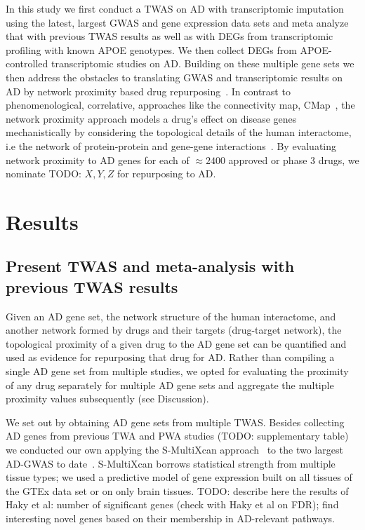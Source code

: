 \documentclass[letterpaper]{article}
\begin{document}
In this study we first conduct a TWAS on AD with transcriptomic
imputation~\citep{Barbeira2018} using the latest, largest GWAS and
gene expression data sets and meta analyze that with previous TWAS results as
well as with DEGs from transcriptomic profiling with known APOE genotypes.  We
then collect DEGs from APOE-controlled transcriptomic studies on AD.  Building
on these multiple gene sets we then address the obstacles to translating GWAS
and transcriptomic results on AD by network proximity based drug
repurposing~\citep{Cheng2018}.  In contrast to phenomenological, correlative,
approaches like the connectivity map, CMap~\citep{Lamb2006}, the network
proximity approach models a drug's effect on disease genes mechanistically by
considering the topological details of the human interactome, i.e the network
of protein-protein and gene-gene interactions~\citep{Guney2016,Barabasi2011}.
By evaluating network proximity to AD genes for each of $\approx 2400$
approved or phase 3 drugs, we nominate TODO: $X, Y, Z$ for repurposing to AD.

\section{Results}

\subsection{Present TWAS and meta-analysis with previous TWAS results}

Given an AD gene set, the network structure of the human interactome, and
another network formed by drugs and their targets (drug-target network), the
topological proximity of a given drug to the AD gene set can be
quantified\citep{Guney2016} and used as evidence for repurposing that drug for
AD.  Rather than compiling a single AD gene set from multiple studies, we
opted for evaluating the proximity of any drug separately for multiple AD gene
sets and aggregate the multiple proximity values subsequently (see
Discussion).

We set out by obtaining AD gene sets from multiple TWAS.  Besides collecting
AD genes from previous TWA and PWA studies (TODO: supplementary table) we
conducted our own applying the S-MultiXcan approach~\citep{Barbeira2018} to
the two largest AD-GWAS to date~\citep{Schwartzentruber2021,Wightman2021}.
S-MultiXcan borrows statistical strength from multiple tissue types; we used a
predictive model of gene expression built on all tissues of the GTEx data set
or on only brain tissues.  TODO: describe here the results of Haky et al:
number of significant genes (check with Haky et al on FDR); find interesting
novel genes based on their membership in AD-relevant pathways.
\end{document}
